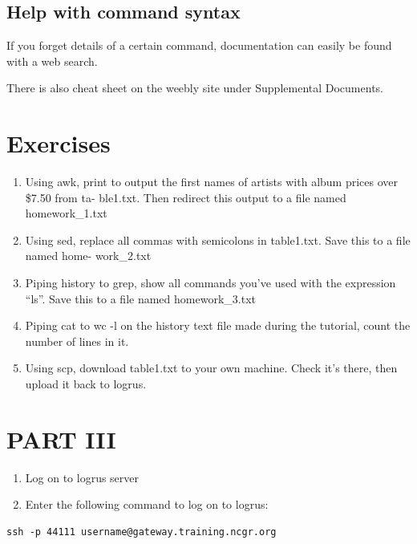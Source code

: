 \documentclass[
]{book}
\begin{document}
\hypertarget{help-with-command-syntax}{%
\subsection{Help with command syntax}\label{help-with-command-syntax}}

If you forget details of a certain command, documentation can easily be found with a web search.

There is also cheat sheet on the weebly site under Supplemental Documents.

\hypertarget{exercises}{%
\section{Exercises}\label{exercises}}

\begin{enumerate}
\def\labelenumi{\arabic{enumi}.}
\item
  Using awk, print to output the first names of artists with album prices over \$7.50 from ta- ble1.txt. Then redirect this output to a file named homework\_1.txt
\item
  Using sed, replace all commas with semicolons in table1.txt. Save this to a file named home- work\_2.txt
\item
  Piping history to grep, show all commands you've used with the expression ``ls''. Save this to a file named homework\_3.txt
\item
  Piping cat to wc -l on the history text file made during the tutorial, count the number of lines in it.
\item
  Using scp, download table1.txt to your own machine. Check it's there, then upload it back to logrus.
\end{enumerate}

\hypertarget{part-iii}{%
\section{PART III}\label{part-iii}}

\begin{enumerate}
\def\labelenumi{\arabic{enumi})}
\item
  Log on to logrus server
\item
  Enter the following command to log on to logrus:
\end{enumerate}

\begin{verbatim}
ssh -p 44111 username@gateway.training.ncgr.org
\end{verbatim}
\end{document}

